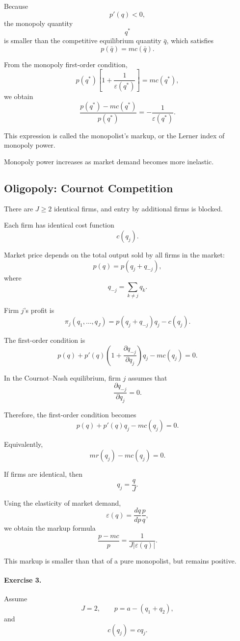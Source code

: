 Because
\[
p'(q)<0,
\]
the monopoly quantity
\[
q^*
\]
is smaller than the competitive equilibrium quantity \(\bar q\), which satisfies
\[
p(\bar q)=mc(\bar q).
\]

From the monopoly first-order condition,
\[
p(q^*)
\left[
1+\frac{1}{\varepsilon(q^*)}
\right]
=
mc(q^*),
\]
we obtain
\[
\frac{
p(q^*)-mc(q^*)
}{
p(q^*)
}
=
-\frac{1}{\varepsilon(q^*)}.
\]

This expression is called the monopolist's markup, or the Lerner index of monopoly power.

Monopoly power increases as market demand becomes more inelastic.



\subsection{Oligopoly: Cournot Competition}

There are \(J\ge 2\) identical firms, and entry by additional firms is blocked.

Each firm has identical cost function
\[
c(q_j).
\]

Market price depends on the total output sold by all firms in the market:
\[
p(q)=p(q_j+q_{-j}),
\]
where
\[
q_{-j}
=
\sum_{k\ne j}q_k.
\]

Firm \(j\)'s profit is
\[
\pi_j(q_1,\dots,q_J)
=
p(q_j+q_{-j})q_j-c(q_j).
\]

The first-order condition is
\[
p(q)
+
p'(q)
\left(
1+\frac{\partial q_{-j}}{\partial q_j}
\right)q_j
-
mc(q_j)
=
0.
\]

In the Cournot--Nash equilibrium, firm \(j\) assumes that
\[
\frac{\partial q_{-j}}{\partial q_j}=0.
\]

Therefore, the first-order condition becomes
\[
p(q)+p'(q)q_j-mc(q_j)=0.
\]

Equivalently,
\[
mr(q_j)-mc(q_j)=0.
\]

If firms are identical, then
\[
q_j=\frac{q}{J}.
\]

Using the elasticity of market demand,
\[
\varepsilon(q)
=
\frac{dq}{dp}\frac{p}{q},
\]
we obtain the markup formula
\[
\frac{p-mc}{p}
=
\frac{1}{J|\varepsilon(q)|}.
\]

This markup is smaller than that of a pure monopolist, but remains positive.

\paragraph{Exercise 3.}
Assume
\[
J=2,
\qquad
p=a-(q_1+q_2),
\]
and
\[
c(q_j)=cq_j.
\]

